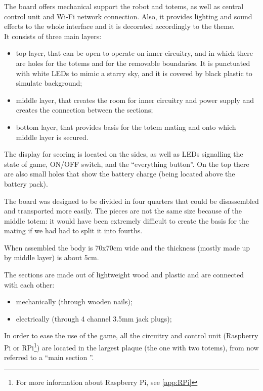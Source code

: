 \documentclass[a4paper,twoside]{book}
\begin{document}
The board offers mechanical support the robot and totems, as well as central control unit and Wi-Fi network connection. Also, it provides lighting and sound effects to the whole interface and it is decorated accordingly to the theme.
\\
It consists of three main layers:

\begin{itemize}
\item top layer, that can be open to operate on inner circuitry, and in which there are holes for the totems and for the removable boundaries. It is punctuated with white LEDs to mimic a starry sky, and it is covered by black plastic to simulate background;
\item middle layer, that creates the room for inner circuitry and power supply and creates the connection between the sections;
\item bottom layer, that provides basis for the totem mating and onto which middle layer is secured.
\end{itemize}

The display for scoring is located on the sides, as well as LEDs signalling the state of game, ON/OFF switch, and the \textquotedblleft everything button\textquotedblright. On the top there are also small holes that show the battery charge (being located above the battery pack).

The board was designed to be divided in four quarters that could be disassembled and transported more easily. The pieces are not the same size because of the middle totem: it would have been extremely difficult to create the basis for the  mating if we had had to split it into fourths.

When assembled the body is 70x70cm wide and the thickness (mostly made up by middle layer) is about 5cm.

The sections are made out of lightweight wood and plastic and are connected with each other:
\begin{itemize}
\item mechanically (through wooden nails);
\item electrically (through 4 channel 3.5mm jack plugs);
\end{itemize}

In order to ease the use of the game, all the circuitry and control unit (Raspberry Pi or RPi\footnote{For more information about Raspberry Pi, see \autoref{app:RPi}}) are located in the largest plaque (the one with two totems), from now referred to a \textquotedblleft main section \textquotedblright.
\end{document}

